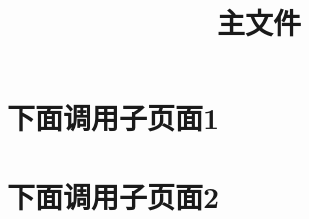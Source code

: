 \documentclass[UTF8]{ctexart}
\title{主文件}
\begin{document}
	\tableofcontents %
	\maketitle  %

\section{下面调用子页面1}


\section{下面调用子页面2}

\end{document}
